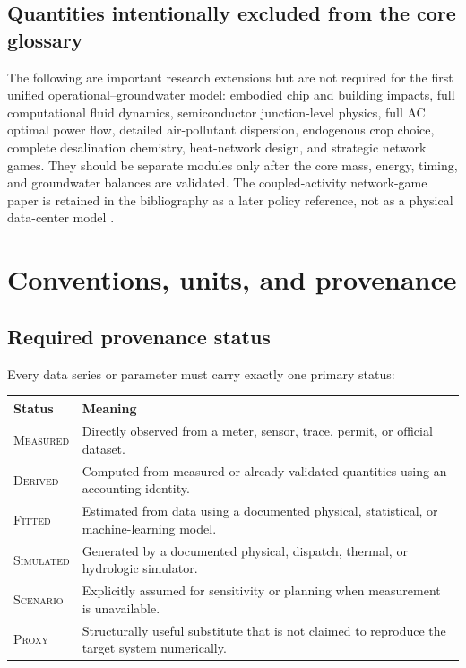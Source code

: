 \documentclass[10pt]{article}
\newcommand{\status}[1]{\textsc{#1}}
\newcommand{\Measured}{\status{Measured}}
\newcommand{\Derived}{\status{Derived}}
\newcommand{\Fitted}{\status{Fitted}}
\newcommand{\Simulated}{\status{Simulated}}
\newcommand{\Scenario}{\status{Scenario}}
\newcommand{\Proxy}{\status{Proxy}}
\begin{document}
\subsection{Quantities intentionally excluded from the core glossary}

The following are important research extensions but are not required for the first unified operational--groundwater model: embodied chip and building impacts, full computational fluid dynamics, semiconductor junction-level physics, full AC optimal power flow, detailed air-pollutant dispersion, endogenous crop choice, complete desalination chemistry, heat-network design, and strategic network games. They should be separate modules only after the core mass, energy, timing, and groundwater balances are validated. The coupled-activity network-game paper is retained in the bibliography as a later policy reference, not as a physical data-center model \cite{parasnis2024games}.

\section{Conventions, units, and provenance}

\subsection{Required provenance status}
Every data series or parameter must carry exactly one primary status:
\begin{center}
\begin{tabular}{ll}
\toprule
Status & Meaning \\
\midrule
\Measured & Directly observed from a meter, sensor, trace, permit, or official dataset. \\
\Derived & Computed from measured or already validated quantities using an accounting identity. \\
\Fitted & Estimated from data using a documented physical, statistical, or machine-learning model. \\
\Simulated & Generated by a documented physical, dispatch, thermal, or hydrologic simulator. \\
\Scenario & Explicitly assumed for sensitivity or planning when measurement is unavailable. \\
\Proxy & Structurally useful substitute that is not claimed to reproduce the target system numerically. \\
\bottomrule
\end{tabular}
\end{center}
\end{document}
